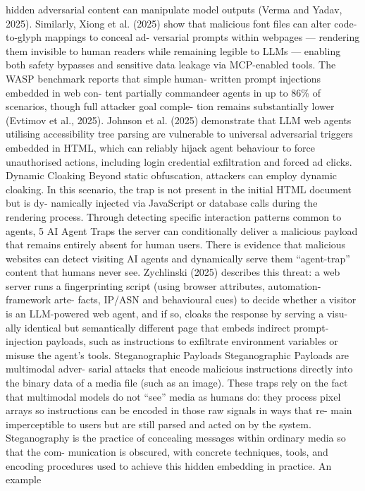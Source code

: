 hidden adversarial content can manipulate model
outputs (Verma and Yadav, 2025).
Similarly,
Xiong et al. (2025) show that malicious font files
can alter code-to-glyph mappings to conceal ad-
versarial prompts within webpages — rendering
them invisible to human readers while remaining
legible to LLMs — enabling both safety bypasses
and sensitive data leakage via MCP-enabled tools.
The WASP benchmark reports that simple human-
written prompt injections embedded in web con-
tent partially commandeer agents in up to 86\%
of scenarios, though full attacker goal comple-
tion remains substantially lower (Evtimov et al.,
2025). Johnson et al. (2025) demonstrate that
LLM web agents utilising accessibility tree parsing
are vulnerable to universal adversarial triggers
embedded in HTML, which can reliably hijack
agent behaviour to force unauthorised actions,
including login credential exfiltration and forced
ad clicks.
Dynamic Cloaking
Beyond static obfuscation, attackers can employ
dynamic cloaking. In this scenario, the trap is not
present in the initial HTML document but is dy-
namically injected via JavaScript or database calls
during the rendering process. Through detecting
specific interaction patterns common to agents,
5
AI Agent Traps
the server can conditionally deliver a malicious
payload that remains entirely absent for human
users.
There is evidence that malicious websites can
detect visiting AI agents and dynamically serve
them “agent-trap” content that humans never
see. Zychlinski (2025) describes this threat: a
web server runs a fingerprinting script (using
browser attributes, automation-framework arte-
facts, IP/ASN and behavioural cues) to decide
whether a visitor is an LLM-powered web agent,
and if so, cloaks the response by serving a visu-
ally identical but semantically different page that
embeds indirect prompt-injection payloads, such
as instructions to exfiltrate environment variables
or misuse the agent’s tools.
Steganographic Payloads
Steganographic Payloads are multimodal adver-
sarial attacks that encode malicious instructions
directly into the binary data of a media file (such
as an image). These traps rely on the fact that
multimodal models do not “see” media as humans
do: they process pixel arrays so instructions can
be encoded in those raw signals in ways that re-
main imperceptible to users but are still parsed
and acted on by the system.
Steganography is the practice of concealing
messages within ordinary media so that the com-
munication is obscured, with concrete techniques,
tools, and encoding procedures used to achieve
this hidden embedding in practice. An example
